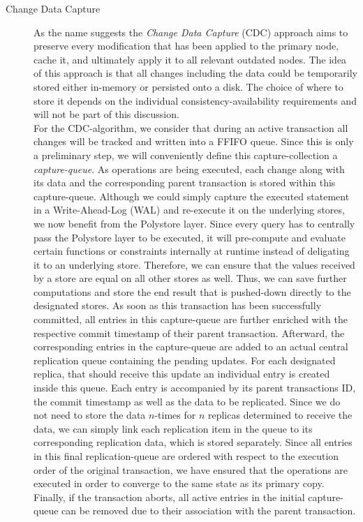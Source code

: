\begin{description}
    \item [Change Data Capture]
     As the name suggests the \emph{Change Data Capture} (CDC) approach aims to preserve every modification that has been applied to the primary node, cache it, and ultimately
    apply it to all relevant outdated nodes. 
    The idea of this approach is that all changes including the data could be temporarily stored either in-memory or persisted onto a disk.
    The choice of where to store it depends on the individual consistency-availability requirements and will not be part of this discussion.\\
    For the CDC-algorithm, we consider that during an active transaction all changes will be tracked and written into a FFIFO queue.
    Since this is only a preliminary step, we will conveniently define this capture-collection a \emph{capture-queue}.
    As operations are being executed, each change along with its data and the corresponding parent transaction is stored within this capture-queue.
    Although we could simply capture the executed statement in a Write-Ahead-Log (WAL) and re-execute it on the underlying stores, we now benefit from the Polystore layer.
    Since every query has to centrally pass the Polystore layer to be executed, it will pre-compute and evaluate certain functions or constraints internally at runtime instead of
    deligating it to an underlying store. Therefore, we can ensure that the values received by a store are equal on all other stores as well.
    Thus, we can save further computations and store the end result that is pushed-down directly
    to the designated stores. As soon as this transaction has been successfully committed, all entries in this capture-queue are further enriched with the respective commit timestamp of their parent transaction.
    Afterward, the corresponding entries in the capture-queue are added to an actual central replication queue containing the pending updates.
    For each designated replica, that should receive this update an individual entry is created inside this queue. 
    Each entry is accompanied by its parent transactions ID, the commit timestamp as well as the data to be replicated.
    Since we do not need to store the data $n$-times for $n$ replicas determined to receive the data, we can simply link each replication item in the queue to its 
    corresponding replication data, which is stored separately. 
    Since all entries in this final replication-queue are ordered with respect to the execution order of the original transaction,
    we have ensured that the operations are executed in order to converge to the same state as its primary copy.\\ 
    Finally, if the transaction aborts, all active entries in the initial capture-queue can be removed due to their association with the parent transaction.\\




\end{description}
